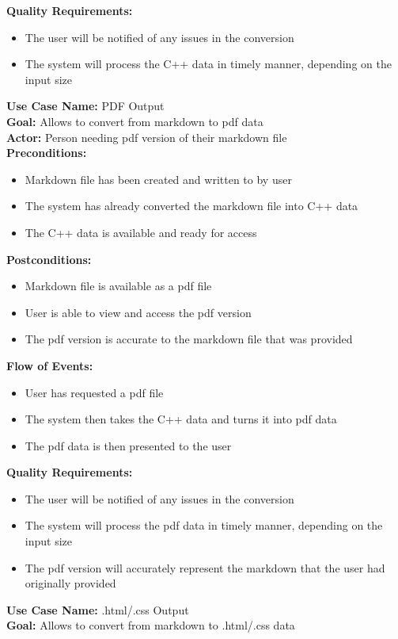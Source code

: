 \textbf{Quality Requirements:} 
\begin{itemize}
\item The user will be notified of any issues in the conversion
\item The system will process the C++ data in timely manner, depending on the input size 
\end{itemize}
\textbf{Use Case Name:} PDF Output  
\\
\textbf{Goal:} Allows to convert from markdown to pdf data
\\
\textbf{Actor:} Person needing pdf version of their markdown file
\\
\textbf{Preconditions:} 
\begin{itemize}
\item Markdown file has been created and written to by user 
\item The system has already converted the markdown file into C++ data
\item The C++ data is available and ready for access 
\end{itemize}
\textbf{Postconditions:} 
\begin{itemize}
\item Markdown file is available as a pdf file 
\item User is able to view and access the pdf version
\item The pdf version is accurate to the markdown file that was provided 
\end{itemize}
\textbf{Flow of Events:} 
\begin{itemize} 
\item User has requested a pdf file
\item The system then takes the C++ data and turns it into pdf data 
\item The pdf data is then presented to the user 
\end{itemize}
\textbf{Quality Requirements:} 
\begin{itemize}
\item The user will be notified of any issues in the conversion
\item The system will process the pdf data in timely manner, depending on the input size 
\item The pdf version will accurately represent the markdown that the user had originally provided
%
\end{itemize} 
\textbf{Use Case Name:} .html/.css Output  
\\
\textbf{Goal:} Allows to convert from markdown to .html/.css data
